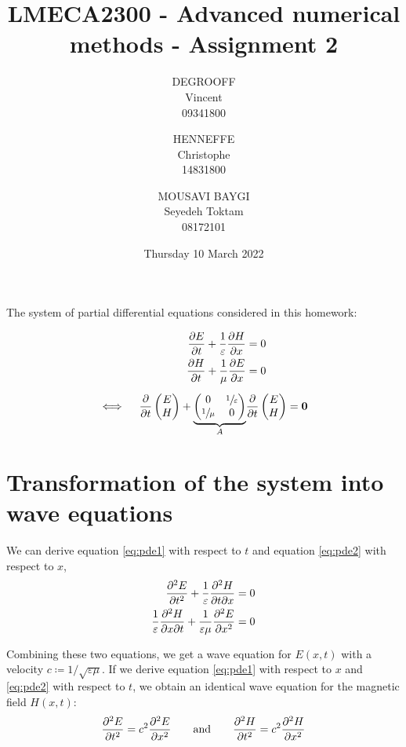 \documentclass[11 pt]{article}
\title{LMECA2300 - Advanced numerical methods - Assignment 2}
\author{
    DEGROOFF\\ Vincent\\ 09341800
    \and
    HENNEFFE\\ Christophe\\ 14831800
    \and
    MOUSAVI BAYGI\\ Seyedeh Toktam\\ 08172101
}
\date{Thursday 10 March 2022}
\begin{document}
\maketitle

\vspace{-2mm}
The system of partial differential equations considered in this homework:

\begin{align}
    \pdv{E}{t} + \frac{1}{\varepsilon} \pdv{H}{x} &= 0 \label{eq:pde1}\\
    \pdv{H}{t} + \frac{1}{\mu} \pdv{E}{x} &= 0\label{eq:pde2}\\[5pt]
    \iff \quad \pdv{}{t}
        \begin{pmatrix}E\\H\end{pmatrix}
    +
    \underbrace{
    \begin{pmatrix}
    0& \sfrac{1}{\varepsilon} \\
    \sfrac{1}{\mu} & 0
    \end{pmatrix}
    }_{A}
    &\pdv{}{t}
    \begin{pmatrix}E\\H\end{pmatrix}
    =\mathbf{0}\nonumber
\end{align}

\vspace{-6mm}
\section{Transformation of the system into wave equations}
We can derive equation \eqref{eq:pde1} with respect to $t$ and equation \eqref{eq:pde2} with respect to $x$,
\begin{align*}
    \pdv[2]{E}{t} + \frac{1}{\varepsilon} \pdv[2]{H}{t}{x}&=0\\
    \frac{1}{\varepsilon}\pdv[2]{H}{x}{t} + \frac{1}{\varepsilon \mu} \pdv[2]{E}{x}&=0
\end{align*}

Combining these two equations, we get a wave equation for $E(x,t)$ with a velocity $c\coloneqq 1/\sqrt{\varepsilon \mu}$. If we derive equation \eqref{eq:pde1} with respect to $x$ and \eqref{eq:pde2} with respect to $t$, we obtain an identical wave equation for the magnetic field $H(x,t)$:
\begin{align*}
    \pdv[2]{E}{t} = c^2\pdv[2]{E}{x} \qquad \text{and} \qquad \pdv[2]{H}{t} = c^2\pdv[2]{H}{x}
\end{align*}
\end{document}
